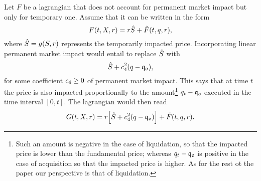 \documentclass[10pt,a4paper]{article}
\begin{document}
Let $F$ be a lagrangian that does not account for permanent market impact but only for temporary one. Assume that it can be written in the form 
\begin{equation}\label{eq.lagrangianWithOnlyInstantaneousImpact}
F(t,X,r)= r\hat{S} +\tilde{F}(t,q,r),
\end{equation}
where $\hat{S}=g(S,r)$ represents the temporarily impacted price. Incorporating linear permanent market impact would entail to replace $\hat{S}$ with 
\begin{equation*}
\hat{S} + c_{4}^{2} (q - \mathfrak{q_0}),
\end{equation*}
for some coefficient $c_{4}\geq 0$ of permanent market impact. This says that at time $t$ the  price is also impacted proportionally to the amount\footnote{Such an amount is negative in the case of liquidation, so that the impacted price is lower than the fundamental price; whereas $q_t-\mathfrak{q_0}$ is positive in the case of acquisition so that the impacted price is higher. As for the rest ot the paper our perspective is that of liquidation.} $q_t - \mathfrak{q_0}$ executed in the time interval $[0,t]$. The lagrangian would then read 
\begin{equation}\label{eq.lagrangianWithAdditivePermanentImpact}
G (t,X,r) =
r\Big[\hat{S}+ c_{4}^{2} (q - \mathfrak{q_0})\Big] +\tilde{F}(t,q,r).
\end{equation}
\end{document}
